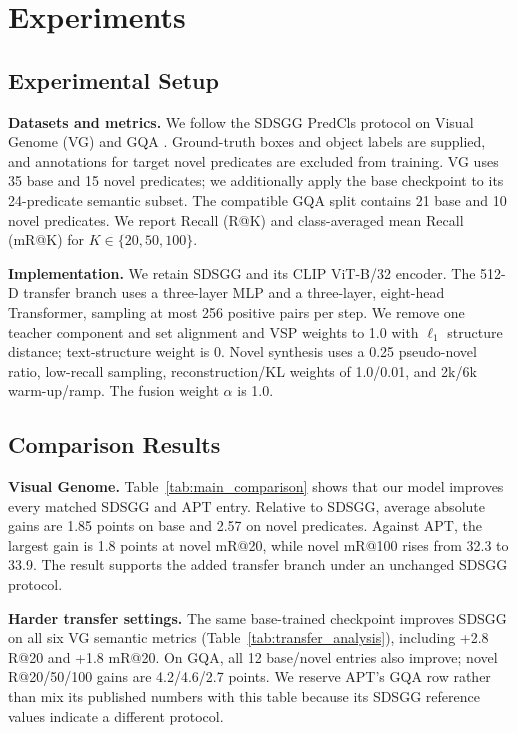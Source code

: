 \section{Experiments}
\label{sec:experiments}

\subsection{Experimental Setup}
\label{sec:exp_setup}

\textbf{Datasets and metrics.}
We follow the SDSGG PredCls protocol \cite{chen2024sdsgg} on Visual Genome
(VG) \cite{krishna2017visualgenome} and GQA \cite{hudson2019gqa}. Ground-truth
boxes and object labels are supplied, and annotations for target novel
predicates are excluded from training. VG uses 35 base and 15 novel predicates;
we additionally apply the base checkpoint to its 24-predicate semantic subset.
The compatible GQA split contains 21 base and 10 novel predicates. We report
Recall (R@K) and class-averaged mean Recall (mR@K) for
$K\in\{20,50,100\}$.

\textbf{Implementation.}
We retain SDSGG and its CLIP ViT-B/32 encoder. The 512-D transfer branch uses a
three-layer MLP and a three-layer, eight-head Transformer, sampling at most 256
positive pairs per step. We remove one teacher component and set alignment and
VSP weights to 1.0 with $\ell_1$ structure distance; text-structure weight is
0. Novel synthesis uses a 0.25 pseudo-novel ratio, low-recall sampling,
reconstruction/KL weights of 1.0/0.01, and 2k/6k warm-up/ramp. The fusion
weight $\alpha$ is 1.0.

\subsection{Comparison Results}
\label{sec:exp_comparison}



\textbf{Visual Genome.}
Table~\ref{tab:main_comparison} shows that our model improves every matched
SDSGG and APT entry. Relative to SDSGG, average absolute gains are 1.85 points
on base and 2.57 on novel predicates. Against APT, the largest gain is 1.8
points at novel mR@20, while novel mR@100 rises from 32.3 to 33.9. The result
supports the added transfer branch under an unchanged SDSGG protocol.



\textbf{Harder transfer settings.}
The same base-trained checkpoint improves SDSGG on all six VG semantic metrics
(Table~\ref{tab:transfer_analysis}), including +2.8 R@20 and +1.8 mR@20.
On GQA, all 12 base/novel entries also improve; novel R@20/50/100 gains are
4.2/4.6/2.7 points. We reserve APT's GQA row rather than mix its published
numbers with this table because its SDSGG reference values indicate a different
protocol.

